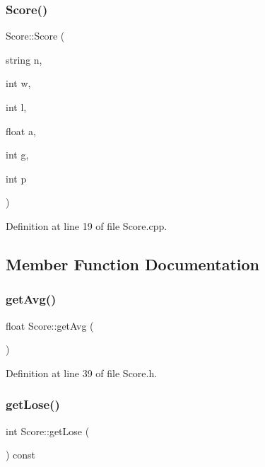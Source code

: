 \subsubsection{\texorpdfstring{Score()}{Score()}\hspace{0.1cm}{\footnotesize\ttfamily [2/2]}}
{\footnotesize\ttfamily Score\+::\+Score (\begin{DoxyParamCaption}\item[{string}]{n,  }\item[{int}]{w,  }\item[{int}]{l,  }\item[{float}]{a,  }\item[{int}]{g,  }\item[{int}]{p }\end{DoxyParamCaption})}



Definition at line 19 of file Score.\+cpp.



\subsection{Member Function Documentation}
\hypertarget{class_score_a4384da2fcbec46a731bca24a883cfed0}{}\label{class_score_a4384da2fcbec46a731bca24a883cfed0} 
\subsubsection{\texorpdfstring{get\+Avg()}{getAvg()}}
{\footnotesize\ttfamily float Score\+::get\+Avg (\begin{DoxyParamCaption}{ }\end{DoxyParamCaption})\hspace{0.3cm}{\ttfamily [inline]}}



Definition at line 39 of file Score.\+h.

\hypertarget{class_score_acfb7bf79eed840c286be8f2e05dbcc08}{}\label{class_score_acfb7bf79eed840c286be8f2e05dbcc08} 
\subsubsection{\texorpdfstring{get\+Lose()}{getLose()}}
{\footnotesize\ttfamily int Score\+::get\+Lose (\begin{DoxyParamCaption}{ }\end{DoxyParamCaption}) const\hspace{0.3cm}{\ttfamily [inline]}}



